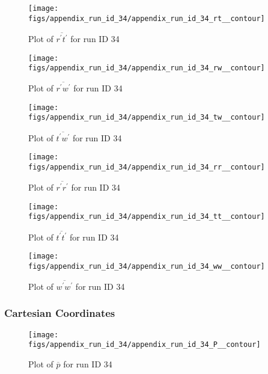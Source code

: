 \begin{figure}[H]
\centering
\texttt{[image: figs/appendix\_run\_id\_34/appendix\_run\_id\_34\_rt\_\_contour]}
\caption{Plot of $\overline{r^\prime t^\prime}$ for run ID 34}
\label{fig:appendix_run_id_34_rt__contour}
\end{figure}


\begin{figure}[H]
\centering
\texttt{[image: figs/appendix\_run\_id\_34/appendix\_run\_id\_34\_rw\_\_contour]}
\caption{Plot of $\overline{r^\prime w^\prime}$ for run ID 34}
\label{fig:appendix_run_id_34_rw__contour}
\end{figure}


\begin{figure}[H]
\centering
\texttt{[image: figs/appendix\_run\_id\_34/appendix\_run\_id\_34\_tw\_\_contour]}
\caption{Plot of $\overline{t^\prime w^\prime}$ for run ID 34}
\label{fig:appendix_run_id_34_tw__contour}
\end{figure}


\begin{figure}[H]
\centering
\texttt{[image: figs/appendix\_run\_id\_34/appendix\_run\_id\_34\_rr\_\_contour]}
\caption{Plot of $\overline{r^\prime r^\prime}$ for run ID 34}
\label{fig:appendix_run_id_34_rr__contour}
\end{figure}


\begin{figure}[H]
\centering
\texttt{[image: figs/appendix\_run\_id\_34/appendix\_run\_id\_34\_tt\_\_contour]}
\caption{Plot of $\overline{t^\prime t^\prime}$ for run ID 34}
\label{fig:appendix_run_id_34_tt__contour}
\end{figure}


\begin{figure}[H]
\centering
\texttt{[image: figs/appendix\_run\_id\_34/appendix\_run\_id\_34\_ww\_\_contour]}
\caption{Plot of $\overline{w^\prime w^\prime}$ for run ID 34}
\label{fig:appendix_run_id_34_ww__contour}
\end{figure}


\subsubsection{Cartesian Coordinates}
\begin{figure}[H]
\centering
\texttt{[image: figs/appendix\_run\_id\_34/appendix\_run\_id\_34\_P\_\_contour]}
\caption{Plot of $\overline{p}$ for run ID 34}
\label{fig:appendix_run_id_34_P__contour}
\end{figure}


